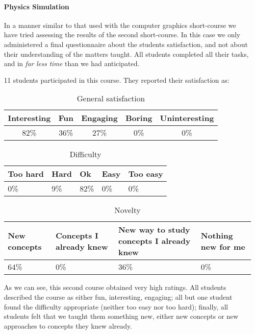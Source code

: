 \paragraph{Physics Simulation}

In a manner similar to that used with the computer graphics short-course we have tried assessing the results of the second short-course. In this case we only administered a final questionnaire about the students satisfaction, and not about their understanding of the matters taught. All students completed all their tasks, and in \textit{far less time} than we had anticipated.

11 students participated in this course. They reported their satisfaction as:

\begin{table}[htb]
\centering
\begin{tabular}{|c|c|c|c|c|}
\hline
Interesting & Fun & Engaging & Boring & Uninteresting\\
\hline
82\% & 36\% & 27\% & 0\% & 0\% \\
\hline
\end{tabular}
\caption{General satisfaction}
\end{table}

\begin{table}[htb]
\centering
\begin{tabular}{|p{1.2cm}|p{1.2cm}|p{1.2cm}|p{1.2cm}|p{1.2cm}|}
\hline
Too hard & Hard & Ok & Easy & Too easy \\
\hline
0\% & 9\% & 82\% & 0\% & 0\% \\
\hline
\end{tabular}
\caption{Difficulty}
\end{table}

\begin{table}[htb]
\centering
\begin{tabular}{|p{1.4cm}|p{1.4cm}|p{1.4cm}|p{1.4cm}|}
\hline
New concepts & Concepts I already knew & New way to study concepts I already knew & Nothing new for me \\
\hline
64\% & 0\% & 36\% & 0\% \\
\hline
\end{tabular}
\caption{Novelty}
\end{table}

As we can see, this second course obtained very high ratings. All students described the course as either fun, interesting, engaging; all but one student found the difficulty appropriate (neither too easy nor too hard); finally, all students felt that we taught them something new, either new concepts or new approaches to concepts they knew already.


